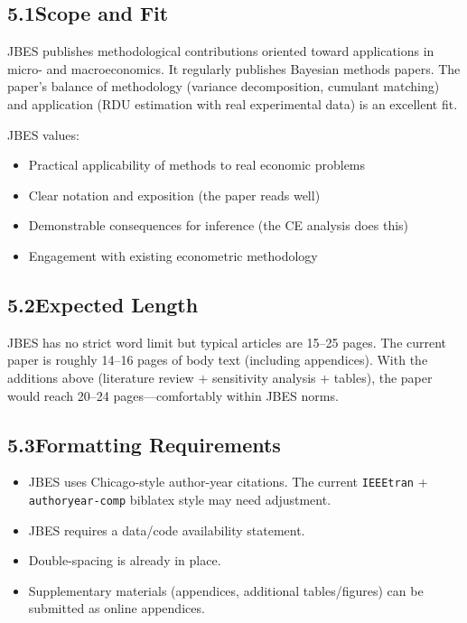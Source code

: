 \documentclass[12pt,a4paper]{article}
\begin{document}
\subsection{5.1\quad Scope and Fit}

JBES publishes methodological contributions oriented toward applications in
micro- and macroeconomics.  It regularly publishes Bayesian methods papers.
The paper's balance of methodology (variance decomposition, cumulant matching)
and application (RDU estimation with real experimental data) is an excellent fit.

JBES values:
\begin{itemize}[leftmargin=1.5em]
\item Practical applicability of methods to real economic problems
\item Clear notation and exposition (the paper reads well)
\item Demonstrable consequences for inference (the CE analysis does this)
\item Engagement with existing econometric methodology
\end{itemize}

\subsection{5.2\quad Expected Length}

JBES has no strict word limit but typical articles are 15--25 pages.  The
current paper is roughly 14--16 pages of body text (including appendices).
With the additions above (literature review $+$ sensitivity analysis $+$ tables),
the paper would reach 20--24 pages---comfortably within JBES norms.

\subsection{5.3\quad Formatting Requirements}

\begin{itemize}[leftmargin=1.5em]
\item JBES uses Chicago-style author-year citations.  The current
\texttt{IEEEtran} + \texttt{authoryear-comp} biblatex style may need
adjustment.
\item JBES requires a data/code availability statement.
\item Double-spacing is already in place.
\item Supplementary materials (appendices, additional tables/figures) can be
submitted as online appendices.
\end{itemize}
\end{document}
